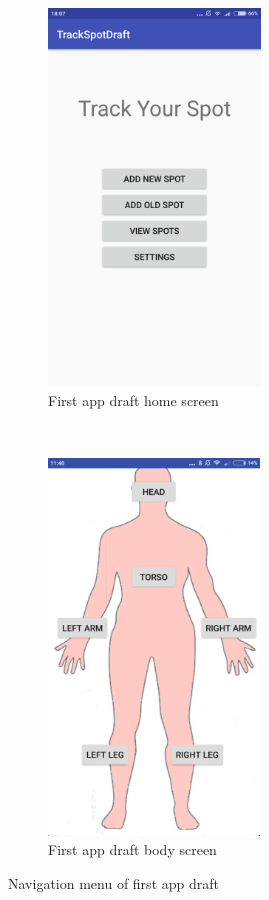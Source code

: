 \begin{figure}[t!]
    \centering
    \begin{subfigure}[t]{0.5\textwidth}
        \centering
        \includegraphics[height=10cm]{figures/draft1menuscreen.png}
        \caption{First app draft home screen}
        \label{fig:draft1menu}
    \end{subfigure}%
    ~
    \begin{subfigure}[t]{0.5\textwidth}
        \centering
        \includegraphics[height=10cm]{figures/draft1bodyscreen.png}
        \caption{First app draft body screen}
    \end{subfigure}
    \caption{Navigation menu of first app draft}
    \label{fig:firstappdraft}
\end{figure}
